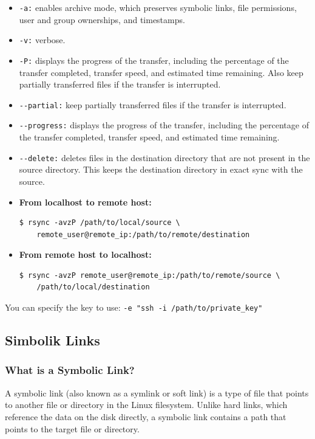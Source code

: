 \documentclass{article}
\newenvironment{blocktemplateII}[1]{%
    \tcolorbox[beamer,%
    noparskip,breakable,
    colframe=Green,%
    colbacklower=LimeGreen!75!LightGreen,%
    title=#1]}%
    {\endtcolorbox}
\newenvironment{codetemplate}[1][]{%
  \mybasecolorbox[#1]
  \itshape
}{%
  \endmybasecolorbox
}
\begin{document}
\begin{itemize}
    \item \verb|-a:| enables archive mode, which preserves symbolic links, file permissions, user and group ownerships, and timestamps.
    \item \verb|-v:| verbose.
    \item \verb|-P:| displays the progress of the transfer, including the percentage of the transfer completed, transfer speed, and estimated time remaining. Also keep partially transferred files if the transfer is interrupted.
    \item \verb|--partial:| keep partially transferred files if the transfer is interrupted.
    \item \verb|--progress:| displays the progress of the transfer, including the percentage of the transfer completed, transfer speed, and estimated time remaining.
    \item \verb|--delete:| deletes files in the destination directory that are not present in the source directory. This keeps the destination directory in exact sync with the source.
    \item \textbf{From localhost to remote host:} 
\begin{codetemplate}{}
\begin{verbatim}
$ rsync -avzP /path/to/local/source \
    remote_user@remote_ip:/path/to/remote/destination
\end{verbatim}
\end{codetemplate}

    \item \textbf{From remote host to localhost:} 
\begin{codetemplate}{}
\begin{verbatim}
$ rsync -avzP remote_user@remote_ip:/path/to/remote/source \
    /path/to/local/destination 
\end{verbatim}
\end{codetemplate}
\end{itemize}

\begin{blocktemplateII}{Note}
You can specify the key to use: \verb|-e "ssh -i /path/to/private_key"|
\end{blocktemplateII}
    

\subsection{Simbolik Links}
\subsubsection{What is a Symbolic Link?}
A symbolic link (also known as a symlink or soft link) is a type of file that points to another file or directory in the Linux filesystem. Unlike hard links, which reference the data on the disk directly, a symbolic link contains a path that points to the target file or directory.
\end{document}
